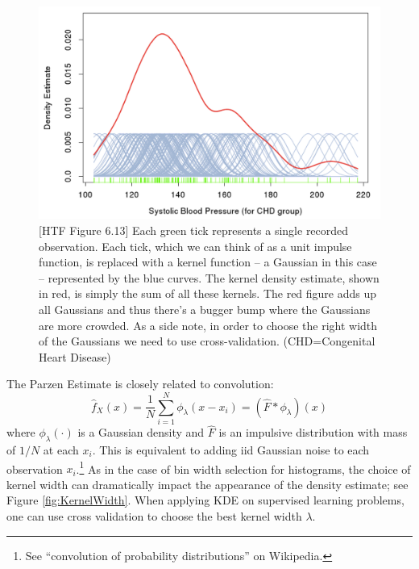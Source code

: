 \documentclass[a4paper]{article}
\begin{document}
\begin{figure}
\centering
\includegraphics[width=1.0\textwidth]{Figure613.png}
\caption{\label{fig:Figure613}[HTF Figure 6.13] Each green tick represents a single recorded observation. Each tick, which we can think of as a unit impulse function, is replaced with a kernel function -- a Gaussian in this case -- represented by the blue curves.  The kernel density estimate, shown in red, is simply the sum of all these kernels. The red figure adds up all Gaussians and thus there's a bugger bump where the Gaussians are more crowded. As a side note, in order to choose the right width of the Gaussians we need to use cross-validation. (CHD=Congenital Heart Disease)}
\end{figure}

The Parzen Estimate is closely related to convolution:
$$\hat{f}_X(x)=\frac{1}{N}\sum_{i=1}^N \phi_\lambda(x-x_i)= (\hat F * \phi_\lambda )(x)$$
where $\phi_\lambda(\cdot)$ is a Gaussian density and $\hat F$ is an impulsive distribution with mass of $1/N$ at each $x_i$.  
This is equivalent to adding iid Gaussian noise to each observation $x_i$.\footnote{See ``convolution of probability distributions'' on Wikipedia.}
As in the case of bin width selection for histograms, the choice of kernel width can dramatically impact the appearance of the density estimate; see Figure \ref{fig:KernelWidth}.  When applying KDE on supervised learning problems, one can use cross validation to choose the best kernel width $\lambda$.
\end{document}
